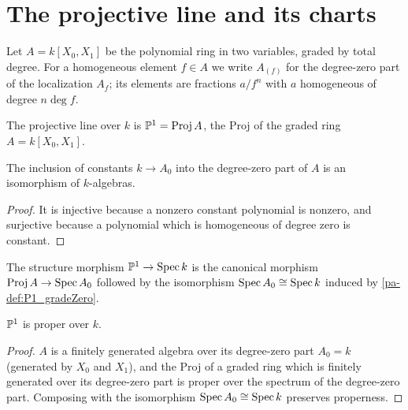 \section{The projective line and its charts}

Let \(A = k[X_0, X_1]\) be the polynomial ring in two variables, graded by total degree. For a
homogeneous element \(f \in A\) we write \(A_{(f)}\) for the degree-zero part of the
localization \(A_f\); its elements are fractions \(a/f^n\) with \(a\) homogeneous of degree
\(n \deg f\).

\begin{definition}
  \label{pa-def:P1}
  \leanok

  The projective line over \(k\) is \(\mathbb{P}^1 = \operatorname{Proj} A\), the Proj of the graded ring
  \(A = k[X_0, X_1]\).
\end{definition}

\begin{definition}
  \label{pa-def:P1_gradeZero}
  \leanok

  The inclusion of constants \(k \to A_0\) into the degree-zero part of \(A\) is an
  isomorphism of \(k\)-algebras.
\end{definition}
\begin{proof}
  \leanok
  It is injective because a nonzero constant polynomial is nonzero, and surjective because a
  polynomial which is homogeneous of degree zero is constant.
\end{proof}

\begin{definition}
  \label{pa-def:P1_structureMap}
  \leanok

  The structure morphism \(\mathbb{P}^1 \to \operatorname{Spec} k\) is the canonical morphism
  \(\operatorname{Proj} A \to \operatorname{Spec} A_0\) followed by the isomorphism \(\operatorname{Spec} A_0 \cong \operatorname{Spec} k\) induced by
  \ref{pa-def:P1_gradeZero}.
\end{definition}

\begin{theorem}
  \label{pa-thm:P1_proper}
  \leanok

  \(\mathbb{P}^1\) is proper over \(k\).
\end{theorem}
\begin{proof}
  \leanok
  \(A\) is a finitely generated algebra over its degree-zero part \(A_0 = k\) (generated by
  \(X_0\) and \(X_1\)), and the Proj of a graded ring which is finitely generated over its
  degree-zero part is proper over the spectrum of the degree-zero part. Composing with the
  isomorphism \(\operatorname{Spec} A_0 \cong \operatorname{Spec} k\) preserves properness.
\end{proof}

